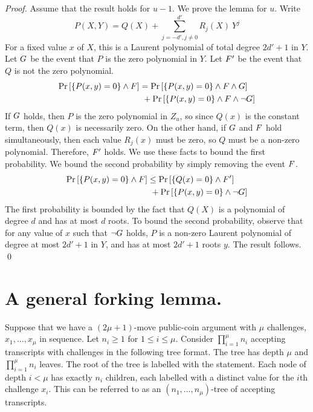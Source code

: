 \begin{proof}
Assume that the result holds for $u-1$. We prove the lemma for $u$. Write
\[
P(X,Y) = Q(X) + \sum_{j=-d', j \neq 0}^{d'} R_{j}(X) \ Y^{j}
\]
For a fixed value $x$ of $X$, this is a Laurent polynomial of total degree $2d'+1$ in $Y$. Let $G$ be the event that $P$ is the zero polynomial in $Y$. Let $F'$ be the event that $Q$ is not the zero polynomial.
\begin{align*}
\Pr \left[ \lbrace P(x,y) = 0 \rbrace \wedge F \right] &= \Pr \left[ \lbrace P(x,y) = 0 \rbrace \wedge F \wedge G\right] \\
& ~ + \Pr \left[ \lbrace P(x,y) = 0 \rbrace \wedge F \wedge \neg G\right] \\
\end{align*}
If $G$ holds, then $P$ is the zero polynomial in $Z_u$, so since $Q(x)$ is the constant term, then $Q(x)$ is necessarily zero. On the other hand, if $G$ and $F$ hold simultaneously, then each value $R_j(x)$ must be zero, so $Q$ must be a non-zero polynomial. Therefore, $F'$ holds. We use these facts to bound the first probability. We bound the second probability by simply removing the event $F$.
\begin{align*}
\Pr \left[ \lbrace P(x,y) = 0 \rbrace \wedge F \right] &\leq \Pr \left[ \lbrace Q(x) = 0 \rbrace \wedge F' \right] \\
& ~ + \Pr \left[ \lbrace P(x,y) = 0 \rbrace \wedge \neg G \right] \\
\end{align*}
The first probability is bounded by the fact that $Q(X)$ is a polynomial of degree $d$ and has at most $d$ roots. To bound the second probability, observe that for any value of $x$ such that $\neg G$ holds, $P$ is a non-zero Laurent polynomial of degree at most $2d'+1$ in $Y$, and has at most $2d'+1$ roots $y$. The result follows.
\qed
\end{proof}

\section{A general forking lemma.}
Suppose that we have a $(2\mu+1)$-move public-coin argument with $\mu$ challenges, $x_1,\ldots,x_\mu$ in sequence. Let $n_i\geq 1$ for $1\leq i \leq \mu$.  Consider $\prod_{i=1}^\mu n_i$ accepting transcripts with challenges in the following tree format. The tree has depth $\mu$ and $\prod_{i=1}^\mu n_i$ leaves. The root of the tree is labelled with the statement. Each node of depth $i<\mu$ has exactly $n_i$ children, each labelled with a distinct value for the $i$th challenge $x_i$. This can be referred to as an $(n_1,\ldots,n_\mu)$-tree of accepting transcripts. 

